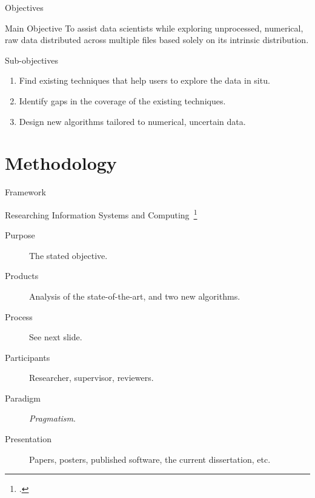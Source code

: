 \documentclass[10pt]{beamer}
\begin{document}
\begin{frame}{Objectives}
\begin{alertblock}{Main Objective}
    \smallskip
    To assist data scientists while exploring unprocessed, numerical, raw data distributed across multiple
    files based solely on its intrinsic distribution.
\end{alertblock}

\begin{block}{Sub-objectives}
    \begin{enumerate}
        \item Find existing techniques that help users to explore the data in situ.
        \item Identify gaps in the coverage of the existing techniques.
        \item Design new algorithms tailored to numerical, uncertain data.
    \end{enumerate}
\end{block}

\end{frame}

\section{Methodology}

\begin{frame}{Framework}
\begin{block}{\alert{Researching Information Systems and Computing}~\footcite{Oates2006}}

\begin{description}
    \item[Purpose] The stated objective.
    \item[Products] Analysis of the state-of-the-art, and two new algorithms.
    \item[Process] See next slide.
    \item[Participants] Researcher, supervisor, reviewers.
    \item[Paradigm] \emph{Pragmatism}.
    \item[Presentation] Papers, posters, published software, the current dissertation, etc.
\end{description}

\end{block}

\end{frame}
\end{document}
